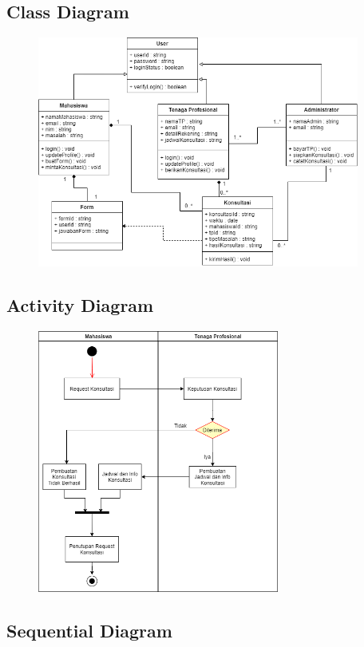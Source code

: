 \documentclass{article}
\begin{document}
	\subsection{Class Diagram}
	\begin{figure}[H]
		\centering
		\includegraphics[width=400px]{class_diagram.png}
	\end{figure}

	\subsection{Activity Diagram}
	\begin{figure}[H]
		\centering
		\includegraphics[width=300px]{Activity Diagram.png}
	\end{figure}

	\subsection{Sequential Diagram}
\end{document}
